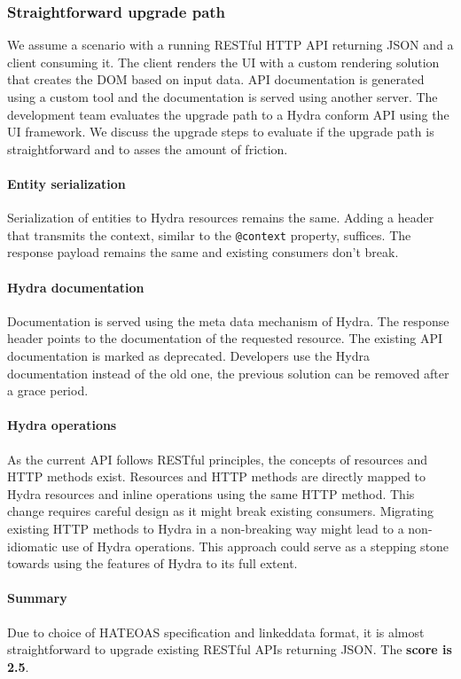 \subsubsection{Straightforward upgrade path}
We assume a scenario with a running RESTful HTTP API returning JSON and a client consuming it. The client renders the UI with a custom rendering solution that creates the DOM based on input data. API documentation is generated using a custom tool and the documentation is served using another server. The development team evaluates the upgrade path to a Hydra conform API using the UI framework. We discuss the upgrade steps to evaluate if the upgrade path is straightforward and to asses the amount of friction.

\paragraph{Entity serialization}
Serialization of entities to Hydra resources remains the same. Adding a header that transmits the context, similar to the \lstinline{@context} property, suffices. The response payload remains the same and existing consumers don't break.

\paragraph{Hydra documentation}
Documentation is served using the meta data mechanism of Hydra. The response header points to the documentation of the requested resource. The existing API documentation is marked as deprecated. Developers use the Hydra documentation instead of the old one, the previous solution can be removed after a grace period.

\paragraph{Hydra operations}
As the current API follows RESTful principles, the concepts of resources and HTTP methods exist. Resources and HTTP methods are directly mapped to Hydra resources and inline operations using the same HTTP method. This change requires careful design as it might break existing consumers. Migrating existing HTTP methods to Hydra in a non-breaking way might lead to a non-idiomatic use of Hydra operations. This approach could serve as a stepping stone towards using the features of Hydra to its full extent.

\paragraph{Summary}
Due to choice of HATEOAS specification and \gls{linkeddata} format, it is almost straightforward to upgrade existing RESTful APIs returning JSON. The \textbf{score is 2.5}.

